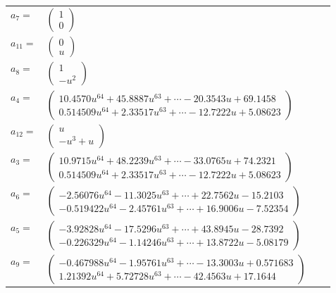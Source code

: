 \documentclass[1p]{elsarticle_modified}
\theoremstyle{definition}
\begin{document}
\begin{tabular}{m{7pt} m{180pt} m{7pt} m{180pt} }
\flushright $a_{7}=$&$\begin{pmatrix}1\\0\end{pmatrix}$ \\
\flushright $a_{11}=$&$\begin{pmatrix}0\\u\end{pmatrix}$ \\
\flushright $a_{8}=$&$\begin{pmatrix}1\\- u^2\end{pmatrix}$ \\
\flushright $a_{4}=$&$\begin{pmatrix}10.4570 u^{64}+45.8887 u^{63}+\cdots-20.3543 u+69.1458\\0.514509 u^{64}+2.33517 u^{63}+\cdots-12.7222 u+5.08623\end{pmatrix}$ \\
\flushright $a_{12}=$&$\begin{pmatrix}u\\- u^3+u\end{pmatrix}$ \\
\flushright $a_{3}=$&$\begin{pmatrix}10.9715 u^{64}+48.2239 u^{63}+\cdots-33.0765 u+74.2321\\0.514509 u^{64}+2.33517 u^{63}+\cdots-12.7222 u+5.08623\end{pmatrix}$ \\
\flushright $a_{6}=$&$\begin{pmatrix}-2.56076 u^{64}-11.3025 u^{63}+\cdots+22.7562 u-15.2103\\-0.519422 u^{64}-2.45761 u^{63}+\cdots+16.9006 u-7.52354\end{pmatrix}$ \\
\flushright $a_{5}=$&$\begin{pmatrix}-3.92828 u^{64}-17.5296 u^{63}+\cdots+43.8945 u-28.7392\\-0.226329 u^{64}-1.14246 u^{63}+\cdots+13.8722 u-5.08179\end{pmatrix}$ \\
\flushright $a_{9}=$&$\begin{pmatrix}-0.467988 u^{64}-1.95761 u^{63}+\cdots-13.3003 u+0.571683\\1.21392 u^{64}+5.72728 u^{63}+\cdots-42.4563 u+17.1644\end{pmatrix}$ \\

\end{tabular}
\end{document}
